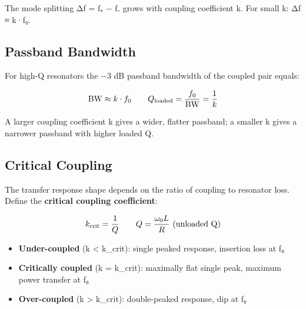 The mode splitting Δf = f₊ − f₋ grows with coupling coefficient k. For small k: Δf ≈ k·f₀.

				

\subsection{Passband Bandwidth}

				

For high-Q resonators the −3 dB passband bandwidth of the coupled pair equals:

				
\[\text{BW} \approx k\cdot f_0 \qquad Q_{\rm loaded} = \dfrac{f_0}{\text{BW}} = \dfrac{1}{k}\]

				

A larger coupling coefficient k gives a wider, flatter passband; a smaller k gives a narrower passband with higher loaded Q.

				

\subsection{Critical Coupling}

				

The transfer response shape depends on the ratio of coupling to resonator loss. Define the \textbf{critical coupling coefficient}:

				
\[k_{\rm crit} = \dfrac{1}{Q}\qquad Q = \dfrac{\omega_0 L}{R}\text{ (unloaded Q)}\]

				
\begin{itemize}

					\item \textbf{Under-coupled} (k \textless{} k\_crit): single peaked response, insertion loss at f₀

					\item \textbf{Critically coupled} (k = k\_crit): maximally flat single peak, maximum power transfer at f₀

					\item \textbf{Over-coupled} (k \textgreater{} k\_crit): double-peaked response, dip at f₀

				
\end{itemize}

				
					


					


